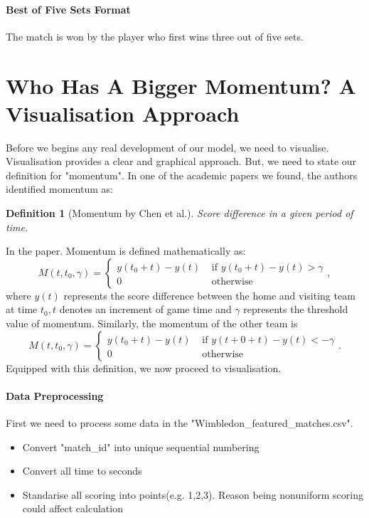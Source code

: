 \documentclass[11pt,a4paper]{article}
\newtheorem{definition}[theorem]{Definition}
\begin{document}
	\paragraph{Best of Five Sets Format}
	The match is won by the player who first wins three out of five sets.
	
	\section{Who Has A Bigger Momentum? A Visualisation Approach}
	Before we begins any real development of our model, we need to visualise. Visualisation provides a clear and graphical approach. But, we need to state our definition for "momentum". In one of the academic papers we found, the authors \cite{chen-2020} identified momentum as:
	\begin{definition}[Momentum by Chen et al.]
		Score difference in a given period of time.
	\end{definition}	
	In the paper. Momentum is defined mathematically as:
	$$
	M(t, t_0, \gamma)=\left\{\begin{array}{ll}
		y(t_0+t)-y(t) & \text { if } y(t_0+t)-y(t)>\gamma \\
		0 & \text { otherwise }
	\end{array},\right.
	$$
	where $y(t)$ represents the score difference between the home and visiting team at time $t_0, t$ denotes an increment of game time and $\gamma$ represents the threshold value of momentum. Similarly, the momentum of the other team is
	$$
	M(t, t_0, \gamma)=\left\{\begin{array}{ll}
		y(t_0+t)-y(t) & \text { if } y(t+0+t)-y(t)<-\gamma \\
		0 & \text { otherwise }
	\end{array} .\right.
	$$
	Equipped with this definition, we now proceed to visualisation. 
	\paragraph{Data Preprocessing}
	First we need to process some data in the "Wimbledon\_featured\_matches.csv".
	\begin{itemize}
		\item Convert "match\_id" into unique sequential numbering
		\item Convert all time to seconds
		\item Standarise all scoring into points(e.g. 1,2,3). Reason being nonuniform scoring could affect calculation
	\end{itemize}
	
\end{document}
